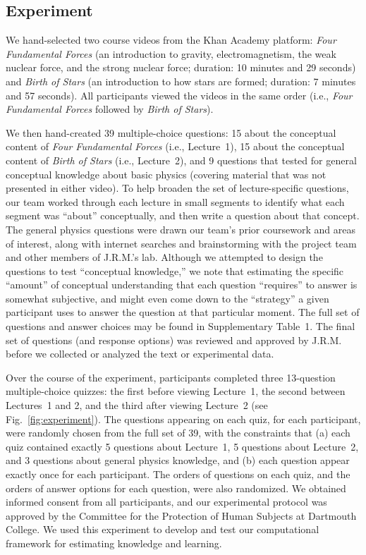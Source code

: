 \documentclass[10pt]{article}
\newcommand{\questions}{1}
\begin{document}
\subsection*{Experiment}\label{subsec:experiment}

We hand-selected two course videos from the Khan Academy platform: \textit{Four
Fundamental Forces} (an introduction to gravity, electromagnetism, the weak
nuclear force, and the strong nuclear force; duration: 10 minutes and 29
seconds) and \textit{Birth of Stars} (an introduction to how stars are formed;
duration: 7 minutes and 57 seconds). All participants viewed the videos in the
same order (i.e., \textit{Four Fundamental Forces} followed by \textit{Birth of
Stars}).

We then hand-created 39 multiple-choice questions: 15 about the conceptual
content of \textit{Four Fundamental Forces} (i.e., Lecture~1), 15 about the
conceptual content of \textit{Birth of Stars} (i.e., Lecture~2), and 9
questions that tested for general conceptual knowledge about basic physics
(covering material that was not presented in either video). To help broaden the
set of lecture-specific questions, our team worked through each lecture in
small segments to identify what each segment was ``about'' conceptually, and
then write a question about that concept. The general physics questions were
drawn our team's prior coursework and areas of interest, along with internet
searches and brainstorming with the project team and other members of J.R.M.'s
lab. Although we attempted to design the questions to test ``conceptual
knowledge,'' we note that estimating the specific ``amount'' of conceptual
understanding that each question ``requires'' to answer is somewhat subjective,
and might even come down to the ``strategy'' a given participant uses to answer
the question at that particular moment. The full set of questions and answer
choices may be found in Supplementary Table~\questions.  The final set of
questions (and response options) was reviewed and approved by J.R.M. before we
collected or analyzed the text or experimental data.

Over the course of the experiment, participants completed three 13-question
multiple-choice quizzes: the first before viewing Lecture~1, the second between
Lectures~1 and 2, and the third after viewing Lecture~2 (see
Fig.~\ref{fig:experiment}). The questions appearing on each quiz, for each
participant, were randomly chosen from the full set of 39, with the constraints
that (a) each quiz contained exactly 5 questions about Lecture~1, 5 questions
about Lecture~2, and 3 questions about general physics knowledge, and (b) each
question appear exactly once for each participant. The orders of questions on
each quiz, and the orders of answer options for each question, were also
randomized. We obtained informed consent from all participants, and our
experimental protocol was approved by the Committee for the Protection of Human
Subjects at Dartmouth College. We used this experiment to develop and test our
computational framework for estimating knowledge and learning.
\end{document}
